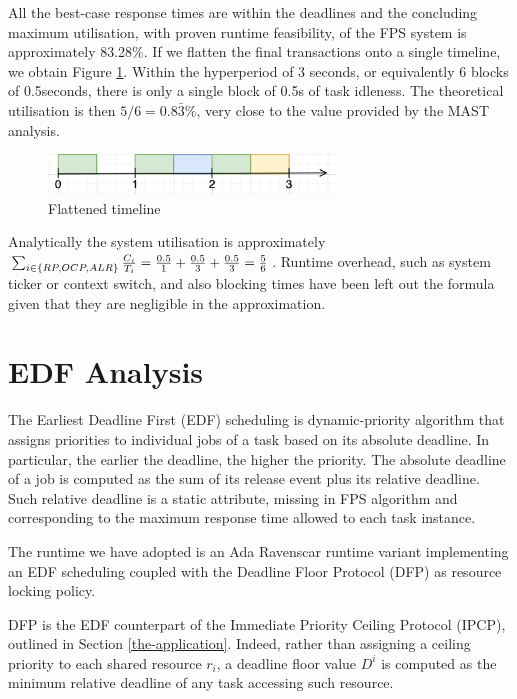\documentclass{article}
\begin{document}
All the best-case response times are within the deadlines and the concluding maximum utilisation, with proven runtime feasibility, of the FPS system is approximately 83.28\%. If we flatten the final transactions onto a single timeline, we obtain Figure \ref{timeline-flatten}. Within the hyperperiod of 3 seconds, or equivalently 6 blocks of 0.5seconds, there is only a single block of 0.5s of task idleness. The theoretical utilisation is then $5 / 6 = 0.8\bar{3}\%$, very close to the value provided by the MAST analysis.

\begin{figure}[!htbp]
   \centering
   \includegraphics[width=3in]{images/timeline-flatten}
   \caption{Flattened timeline}
   \label{timeline-flatten}
   \end{figure}

Analytically the system utilisation is approximately $\sum_{i \in \{RP, OCP, ALR\}}{C_i \over T_i} = {0.5 \over 1} + {0.5 \over 3} + {0.5 \over 3} = {5 \over 6}$. Runtime overhead, such as system ticker or context switch, and also blocking times have been left out the formula given that they are negligible in the approximation.

\section{EDF Analysis}

The Earliest Deadline First (EDF) \cite{fps-vs-edf} scheduling is dynamic-priority algorithm that assigns priorities to individual jobs of a task based on its absolute deadline.
In particular, the earlier the deadline, the higher the priority.
The absolute deadline of a job is computed as the sum of its release event plus its relative deadline. Such relative deadline is a static attribute, missing in FPS algorithm and corresponding to the maximum response time allowed to each task instance.

The runtime we have adopted is an Ada Ravenscar runtime variant implementing an EDF scheduling coupled with the Deadline Floor Protocol (DFP) \cite{resource-sharing} as resource locking policy.

DFP is the EDF counterpart of the Immediate Priority Ceiling Protocol (IPCP), outlined in Section \ref{the-application}. Indeed, rather than assigning a ceiling priority to each shared resource $r_i$, a deadline floor value $D^i$ is computed as the minimum relative deadline of any task accessing such resource.
\end{document}

